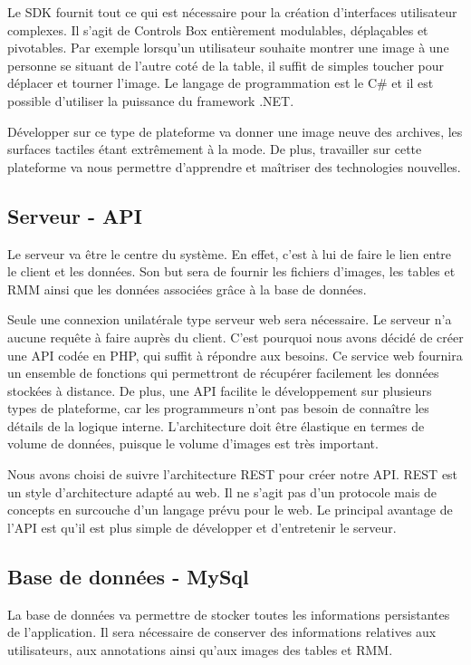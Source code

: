 \documentclass[a4paper]{article}
\begin{document}
Le SDK fournit tout ce qui est nécessaire pour la création d'interfaces utilisateur complexes. Il s'agit de Controls Box entièrement modulables, déplaçables et pivotables. Par exemple lorsqu'un utilisateur souhaite montrer une image à une personne se situant de l'autre coté de la table, il suffit de simples toucher pour déplacer et tourner l'image. Le langage de programmation est le C\# et il est possible d'utiliser la puissance du framework .NET.

Développer sur ce type de plateforme va donner une image neuve des archives, les surfaces tactiles étant extrêmement à la mode. De plus, travailler sur cette plateforme va nous permettre d'apprendre et maîtriser des technologies nouvelles.

\subsection{Serveur - API}
Le serveur va être le centre du système. En effet, c'est à lui de faire le lien entre le client et les données. Son but sera de fournir les fichiers d'images, les tables et RMM ainsi que les données associées grâce à la base de données.

Seule une connexion unilatérale type serveur web sera nécessaire. Le serveur n'a aucune requête à faire auprès du client. C'est pourquoi nous avons décidé de créer une API codée en PHP, qui suffit à répondre aux besoins. Ce service web fournira un ensemble de fonctions qui permettront de récupérer facilement les données stockées à distance. De plus, une API facilite le développement sur plusieurs types de plateforme, car les programmeurs n'ont pas besoin de connaître les détails de la logique interne. L'architecture doit être élastique en termes de volume de données, puisque le volume d'images est très important.

Nous avons choisi de suivre l'architecture REST pour créer notre API. REST est un style d'architecture adapté au web. Il ne s'agit pas d'un protocole mais de concepts en surcouche d'un langage prévu pour le web. Le principal avantage de l'API est qu'il est plus simple de développer et d'entretenir le serveur.

\subsection{Base de données - MySql}
La base de données va permettre de stocker toutes les informations persistantes de l'application. Il sera nécessaire de conserver des informations relatives aux utilisateurs, aux annotations ainsi qu'aux images des tables et RMM.
\end{document}

